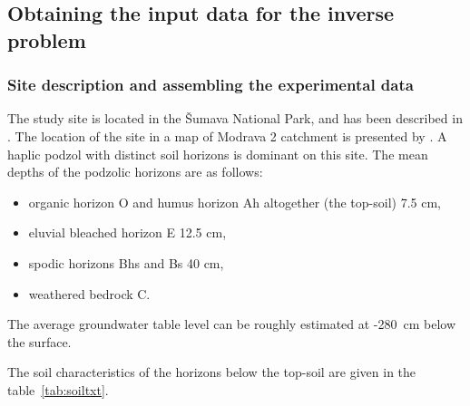 \documentclass[review]{elsarticle}
\begin{document}
\subsection{Obtaining the input data for the inverse problem}
\label{assamb}


\subsubsection{Site description and assembling the experimental data}%
\label{site}
The study site is located in the \v{S}umava National Park, and has been described in \citep{Jacka1}. The location of the site in a map of Modrava 2 catchment is presented by \cite{Jacka2}.
A haplic podzol with distinct soil horizons is dominant on this site. The mean depths of the podzolic horizons are as follows:
\begin{itemize}
\item organic horizon O and humus horizon Ah altogether (the top-soil) 7.5 cm, 
\item eluvial bleached horizon E 12.5 cm, 
\item spodic horizons Bhs and Bs 40 cm,
\item weathered bedrock C.
\end{itemize}
The average groundwater table level can be roughly estimated at -280~cm below the surface. 

The soil characteristics of the horizons below the top-soil %
are given in the table~\ref{tab:soiltxt}. 

%
\end{document}
